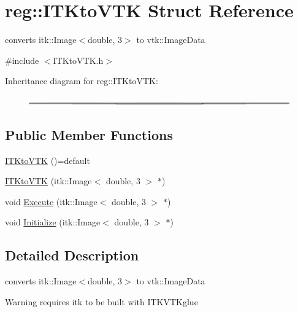 \hypertarget{structreg_1_1_i_t_kto_v_t_k}{}\section{reg\+:\+:I\+T\+Kto\+V\+TK Struct Reference}
\label{structreg_1_1_i_t_kto_v_t_k}


converts itk\+::\+Image$<$double, 3$>$ to vtk\+::\+Image\+Data  




{\ttfamily \#include $<$I\+T\+Kto\+V\+T\+K.\+h$>$}

Inheritance diagram for reg\+:\+:I\+T\+Kto\+V\+TK\+:\begin{figure}[H]
\begin{center}
\leavevmode
\includegraphics[height=0.123267cm]{structreg_1_1_i_t_kto_v_t_k}
\end{center}
\end{figure}
\subsection*{Public Member Functions}
\begin{DoxyCompactItemize}
\item 
\hyperlink{structreg_1_1_i_t_kto_v_t_k_aa877c393c7f899273ac90560680cccaa}{I\+T\+Kto\+V\+TK} ()=default
\item 
\hyperlink{structreg_1_1_i_t_kto_v_t_k_ae2fc7374133514e565fdb3e5d5dfad35}{I\+T\+Kto\+V\+TK} (itk\+::\+Image$<$ double, 3 $>$ $\ast$)
\item 
void \hyperlink{structreg_1_1_i_t_kto_v_t_k_a25b4c1792d1517d235f5c6d7319006f6}{Execute} (itk\+::\+Image$<$ double, 3 $>$ $\ast$)
\item 
void \hyperlink{structreg_1_1_i_t_kto_v_t_k_ab3e02f695618ce6ca0bb577b1cc97e7b}{Initialize} (itk\+::\+Image$<$ double, 3 $>$ $\ast$)
\end{DoxyCompactItemize}


\subsection{Detailed Description}
converts itk\+::\+Image$<$double, 3$>$ to vtk\+::\+Image\+Data 

\begin{DoxyWarning}{Warning}
requires itk to be built with I\+T\+K\+V\+T\+Kglue 
\end{DoxyWarning}


